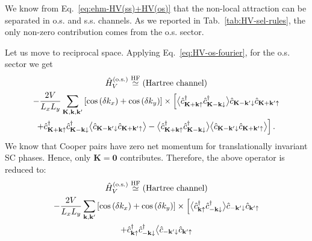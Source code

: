 \begin{tabproof}
	
	We know from Eq.~\eqref{eq:ehm-HV(ss)+HV(os)} that the non-local attraction can be separated in o.s. and s.s. channels. As we reported in Tab.~\ref{tab:HV-sel-rules}, the only non-zero contribution comes from the o.s. sector. 
	
	Let us move to reciprocal space. Applying Eq.~\eqref{eq:HV-os-fourier}, for the o.s. sector we get
	\begin{multline}
		\hat H_V^{(\mathrm{o.s.})} \stackrel{\mathrm{HF}}{\simeq} \text{(Hartree channel)} \\
		-\frac{2V}{L_x L_y}
		\sum_{\mathbf{K}, \mathbf{k}, \mathbf{k}'} \left[
		\cos \left(
		\delta k_x
		\right)	+ \cos \left(
		\delta k_y
		\right)	
		\right]
		\times \Big[ 
		\big\langle
		\hat c_{\mathbf{K}+\mathbf{k} \uparrow}^\dagger \hat c_{\mathbf{K}-\mathbf{k} \downarrow}^\dagger
		\big\rangle 
		\hat c_{\mathbf{K}-\mathbf{k}' \downarrow} \hat c_{\mathbf{K}+\mathbf{k}'\uparrow} \\
		+
		\hat c_{\mathbf{K}+\mathbf{k} \uparrow}^\dagger \hat c_{\mathbf{K}-\mathbf{k} \downarrow}^\dagger
		\big\langle 
		\hat c_{\mathbf{K}-\mathbf{k}' \downarrow} \hat c_{\mathbf{K}+\mathbf{k}'\uparrow}
		\big\rangle
		-
		\big\langle
		\hat c_{\mathbf{K}+\mathbf{k} \uparrow}^\dagger \hat c_{\mathbf{K}-\mathbf{k} \downarrow}^\dagger
		\big\rangle
		\big\langle 
		\hat c_{\mathbf{K}-\mathbf{k}' \downarrow} \hat c_{\mathbf{K}+\mathbf{k}'\uparrow}
		\big\rangle
		\Big] \, . \label{eq:sc-HV-cooper-approx-int1}
	\end{multline}
	We know that Cooper pairs have zero net momentum for translationally invariant SC phases. Hence, only $\mathbf{K}=\mathbf{0}$ contributes. Therefore, the above operator is reduced to:
	\begin{multline*}
		\hat H_V^{(\mathrm{o.s.})} \HFsimeq \text{(Hartree channel)} \\
		-\frac{2V}{L_x L_y}
		\sum_{\mathbf{k}, \mathbf{k}'} \left[
		\cos \left(
		\delta k_x
		\right)	+ \cos \left(
		\delta k_y
		\right)	
		\right]
		\times \Big[ 
		\big\langle
		\hat c_{\mathbf{k} \uparrow}^\dagger \hat c_{-\mathbf{k} \downarrow}^\dagger
		\big\rangle 
		\hat c_{-\mathbf{k}' \downarrow} \hat c_{\mathbf{k}'\uparrow} \\
		+
		\hat c_{\mathbf{k} \uparrow}^\dagger \hat c_{-\mathbf{k} \downarrow}^\dagger
		\big\langle 
		\hat c_{-\mathbf{k}' \downarrow} \hat c_{\mathbf{k}'\uparrow}

\end{multline*}
\end{tabproof}
